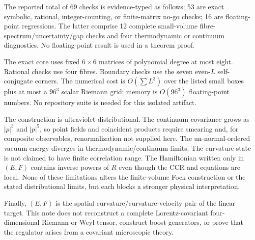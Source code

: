 The reported total of 69 checks is evidence-typed as follows: 53 are exact
symbolic, rational, integer-counting, or finite-matrix no-go checks; 16 are
floating-point regressions.  The latter comprise 12 complete small-volume
fibre-spectrum/uncertainty/gap checks and four thermodynamic or continuum
diagnostics.  No floating-point result is used in a theorem proof.

The exact core uses fixed $6\times6$ matrices of polynomial degree at most
eight.  Rational checks use four fibres.  Boundary checks use the seven even-$L$
self-conjugate corners.  The numerical cost is $O(\sum L^3)$ over the listed
small boxes plus at most a $96^3$ scalar Riemann grid; memory is $O(96^3)$
floating-point numbers.  No repository suite is needed for this isolated
artifact.

The construction is ultraviolet-distributional.  The continuum covariance
grows as $|p|^3$ and $|p|^5$, so point fields and coincident products require
smearing and, for composite observables, renormalization not supplied here.
The un-normal-ordered vacuum energy diverges in thermodynamic/continuum limits.
The curvature state is not claimed to have finite correlation range.  The
Hamiltonian written only in $(E,F)$ contains inverse powers of $R$ even though
the CCR and equations are local.  None of these limitations alters the
finite-volume Fock construction or the stated distributional limits, but each
blocks a stronger physical interpretation.

Finally, $(E,F)$ is the spatial curvature/curvature-velocity pair of the
linear target.  This note does not reconstruct a complete Lorentz-covariant
four-dimensional Riemann or Weyl tensor, construct boost generators, or prove
that the regulator arises from a covariant microscopic theory.
\endgroup
